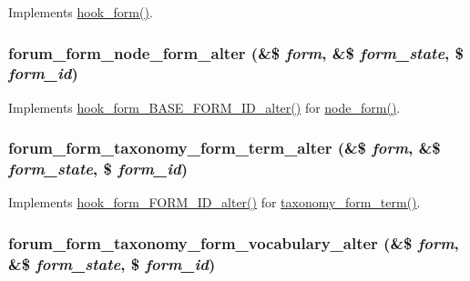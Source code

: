 \label{forum_8module_a882c25e89e68340b62134d83ebb6fbd1}
Implements \hyperlink{group__node__api__hooks_ga52618ef4643a60878dd5a76ff9bbff30}{hook\_\-form()}. \hypertarget{forum_8module_af43bc6e1b64952a66ed3662f1d8c470e}{
\subsubsection[{forum\_\-form\_\-node\_\-form\_\-alter}]{\setlength{\rightskip}{0pt plus 5cm}forum\_\-form\_\-node\_\-form\_\-alter (\&\$ {\em form}, \/  \&\$ {\em form\_\-state}, \/  \$ {\em form\_\-id})}}
\label{forum_8module_af43bc6e1b64952a66ed3662f1d8c470e}
Implements \hyperlink{group__hooks_gaf0cfc224a88c8823da68856c30a4841a}{hook\_\-form\_\-BASE\_\-FORM\_\-ID\_\-alter()} for \hyperlink{group__forms_ga267299500e205db099ee4e8396769d3f}{node\_\-form()}. \hypertarget{forum_8module_addd3b3920f58d59384aa5040f9ba72a4}{
\subsubsection[{forum\_\-form\_\-taxonomy\_\-form\_\-term\_\-alter}]{\setlength{\rightskip}{0pt plus 5cm}forum\_\-form\_\-taxonomy\_\-form\_\-term\_\-alter (\&\$ {\em form}, \/  \&\$ {\em form\_\-state}, \/  \$ {\em form\_\-id})}}
\label{forum_8module_addd3b3920f58d59384aa5040f9ba72a4}
Implements \hyperlink{group__hooks_ga8d4a4089551493d55911bd5c4f218264}{hook\_\-form\_\-FORM\_\-ID\_\-alter()} for \hyperlink{group__forms_gadd038edd60ebd00177106bb97841803c}{taxonomy\_\-form\_\-term()}. \hypertarget{forum_8module_a3702bf881db6198891a4e019ab7b7ffe}{
\subsubsection[{forum\_\-form\_\-taxonomy\_\-form\_\-vocabulary\_\-alter}]{\setlength{\rightskip}{0pt plus 5cm}forum\_\-form\_\-taxonomy\_\-form\_\-vocabulary\_\-alter (\&\$ {\em form}, \/  \&\$ {\em form\_\-state}, \/  \$ {\em form\_\-id})}}
